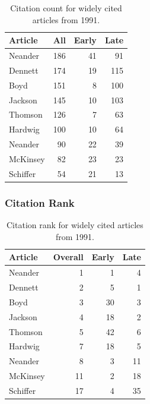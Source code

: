 \documentclass[
  10pt,
  letterpaper,
  DIV=11,
  numbers=noendperiod,
  twoside]{scrartcl}
\begin{document}
\begin{longtable}[]{@{}lrrr@{}}

\caption{\label{tbl-citation-count-1991}Citation count for widely cited
articles from 1991.}

\tabularnewline

\toprule\noalign{}
Article & All & Early & Late \\
\midrule\noalign{}
\endhead
\bottomrule\noalign{}
\endlastfoot
Neander & 186 & 41 & 91 \\
Dennett & 174 & 19 & 115 \\
Boyd & 151 & 8 & 100 \\
Jackson & 145 & 10 & 103 \\
Thomson & 126 & 7 & 63 \\
Hardwig & 100 & 10 & 64 \\
Neander & 90 & 22 & 39 \\
McKinsey & 82 & 23 & 23 \\
Schiffer & 54 & 21 & 13 \\

\end{longtable}

\subsubsection*{Citation Rank}\label{sec-rank-1991}

\begin{longtable}[]{@{}lrrr@{}}

\caption{\label{tbl-citation-rank-1991}Citation rank for widely cited
articles from 1991.}

\tabularnewline

\toprule\noalign{}
Article & Overall & Early & Late \\
\midrule\noalign{}
\endhead
\bottomrule\noalign{}
\endlastfoot
Neander & 1 & 1 & 4 \\
Dennett & 2 & 5 & 1 \\
Boyd & 3 & 30 & 3 \\
Jackson & 4 & 18 & 2 \\
Thomson & 5 & 42 & 6 \\
Hardwig & 7 & 18 & 5 \\
Neander & 8 & 3 & 11 \\
McKinsey & 11 & 2 & 18 \\
Schiffer & 17 & 4 & 35 \\

\end{longtable}
\end{document}
